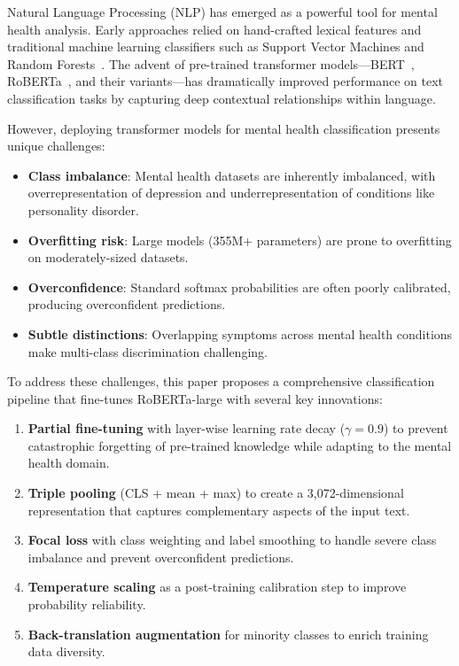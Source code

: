 \documentclass[conference, 10pt]{IEEEtran}
\begin{document}
Natural Language Processing (NLP) has emerged as a powerful tool for mental health analysis. Early approaches relied on hand-crafted lexical features and traditional machine learning classifiers such as Support Vector Machines and Random Forests~\cite{coppersmith2015clpsych}. The advent of pre-trained transformer models—BERT~\cite{devlin2019bert}, RoBERTa~\cite{liu2019roberta}, and their variants—has dramatically improved performance on text classification tasks by capturing deep contextual relationships within language.

However, deploying transformer models for mental health classification presents unique challenges:
\begin{itemize}[noitemsep]
    \item \textbf{Class imbalance}: Mental health datasets are inherently imbalanced, with overrepresentation of depression and underrepresentation of conditions like personality disorder.
    \item \textbf{Overfitting risk}: Large models (355M+ parameters) are prone to overfitting on moderately-sized datasets.
    \item \textbf{Overconfidence}: Standard softmax probabilities are often poorly calibrated, producing overconfident predictions.
    \item \textbf{Subtle distinctions}: Overlapping symptoms across mental health conditions make multi-class discrimination challenging.
\end{itemize}

To address these challenges, this paper proposes a comprehensive classification pipeline that fine-tunes RoBERTa-large with several key innovations:

\begin{enumerate}[noitemsep]
    \item \textbf{Partial fine-tuning} with layer-wise learning rate decay ($\gamma = 0.9$) to prevent catastrophic forgetting of pre-trained knowledge while adapting to the mental health domain.
    \item \textbf{Triple pooling} (CLS + mean + max) to create a 3,072-dimensional representation that captures complementary aspects of the input text.
    \item \textbf{Focal loss} with class weighting and label smoothing to handle severe class imbalance and prevent overconfident predictions.
    \item \textbf{Temperature scaling} as a post-training calibration step to improve probability reliability.
    \item \textbf{Back-translation augmentation} for minority classes to enrich training data diversity.
\end{enumerate}
\end{document}
